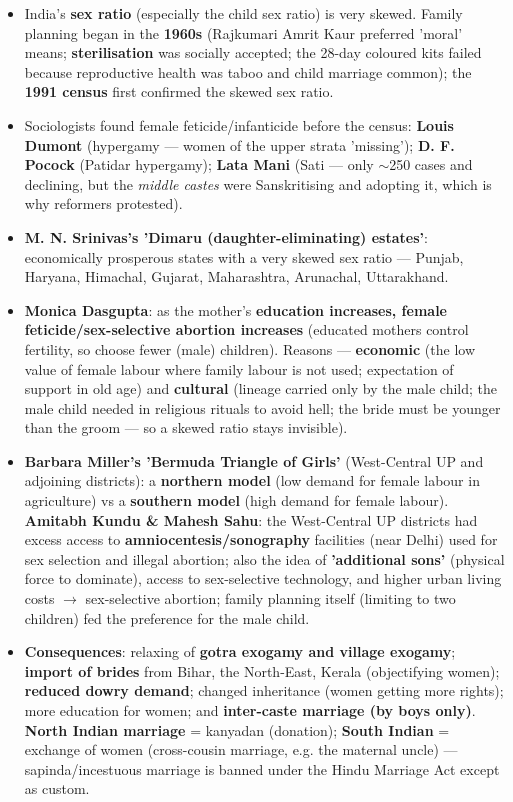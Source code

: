 \begin{KeyConcept}
\begin{itemize}
\item India's \textbf{sex ratio} (especially the child sex ratio) is very skewed. Family planning began in the \textbf{1960s} (Rajkumari Amrit Kaur preferred 'moral' means; \textbf{sterilisation} was socially accepted; the 28-day coloured kits failed because reproductive health was taboo and child marriage common); the \textbf{1991 census} first confirmed the skewed sex ratio.
\item Sociologists found female feticide/infanticide before the census: \textbf{Louis Dumont} (hypergamy --- women of the upper strata 'missing'); \textbf{D. F. Pocock} (Patidar hypergamy); \textbf{Lata Mani} (Sati --- only $\sim$250 cases and declining, but the \emph{middle castes} were Sanskritising and adopting it, which is why reformers protested).
\item \textbf{M. N. Srinivas's 'Dimaru (daughter-eliminating) estates'}: economically prosperous states with a very skewed sex ratio --- Punjab, Haryana, Himachal, Gujarat, Maharashtra, Arunachal, Uttarakhand.
\item \textbf{Monica Dasgupta}: as the mother's \textbf{education increases, female feticide/sex-selective abortion increases} (educated mothers control fertility, so choose fewer (male) children). Reasons --- \textbf{economic} (the low value of female labour where family labour is not used; expectation of support in old age) and \textbf{cultural} (lineage carried only by the male child; the male child needed in religious rituals to avoid hell; the bride must be younger than the groom --- so a skewed ratio stays invisible).
\item \textbf{Barbara Miller's 'Bermuda Triangle of Girls'} (West-Central UP and adjoining districts): a \textbf{northern model} (low demand for female labour in agriculture) vs a \textbf{southern model} (high demand for female labour). \textbf{Amitabh Kundu \& Mahesh Sahu}: the West-Central UP districts had excess access to \textbf{amniocentesis/sonography} facilities (near Delhi) used for sex selection and illegal abortion; also the idea of \textbf{'additional sons'} (physical force to dominate), access to sex-selective technology, and higher urban living costs $\rightarrow$ sex-selective abortion; family planning itself (limiting to two children) fed the preference for the male child.
\item \textbf{Consequences}: relaxing of \textbf{gotra exogamy and village exogamy}; \textbf{import of brides} from Bihar, the North-East, Kerala (objectifying women); \textbf{reduced dowry demand}; changed inheritance (women getting more rights); more education for women; and \textbf{inter-caste marriage (by boys only)}. \textbf{North Indian marriage} = kanyadan (donation); \textbf{South Indian} = exchange of women (cross-cousin marriage, e.g. the maternal uncle) --- sapinda/incestuous marriage is banned under the Hindu Marriage Act except as custom.

\end{itemize}
\end{KeyConcept}
